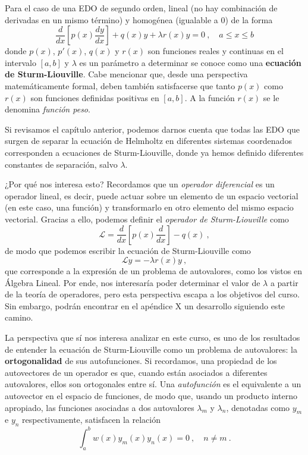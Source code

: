 Para el caso de una EDO de segundo orden, lineal (no hay combinación de derivadas en un mismo término) y homogénea (igualable a 0) de la forma
\begin{equation} \label{eq:Sturm-Liouville}
    \frac{d}{dx}\left[ p(x) \frac{dy}{dx} \right] + q(x) y + \lambda r(x)y = 0 \ , \quad a \leq x \leq b
\end{equation}
donde $p(x)$, $p'(x)$, $q(x)$ y $r(x)$ son funciones reales y continuas en el intervalo $[a,b]$ y $\lambda$ es un parámetro a determinar se conoce como una \textbf{ecuación de Sturm-Liouville}. Cabe mencionar que, desde una perspectiva matemáticamente formal, deben también satisfacerse que tanto $p(x)$ como $r(x)$ son funciones definidas positivas en $[a,b]$. A la función $r(x)$ se le denomina \emph{función peso}.

Si revisamos el capítulo anterior, podemos darnos cuenta que todas las EDO que surgen de separar la ecuación de Helmholtz en diferentes sistemas coordenados corresponden a ecuaciones de Sturm-Liouville, donde ya hemos definido diferentes constantes de separación, salvo $\lambda$.

¿Por qué nos interesa esto? Recordamos que un \emph{operador diferencial} es un operador lineal, es decir, puede actuar sobre un elemento de un espacio vectorial (en este caso, una función) y transformarlo en otro elemento del mismo espacio vectorial. Gracias a ello, podemos definir el \emph{operador de Sturm-Liouville} como
\begin{equation}
    \mathcal{L} = \frac{d}{dx}\left[p(x) \frac{d}{dx}\right] - q(x) \ ,
\end{equation}
de modo que podemos escribir la ecuación de Sturm-Liouville como
\begin{equation}
    \mathcal{L}y = -\lambda r(x) y \ ,
\end{equation}
que corresponde a la expresión de un problema de autovalores, como los vistos en Álgebra Lineal. Por ende, nos interesaría poder determinar el valor de $\lambda$ a partir de la teoría de operadores, pero esta perspectiva escapa a los objetivos del curso. Sin embargo, podrán encontrar en el apéndice X un desarrollo siguiendo este camino.

La perspectiva que sí nos interesa analizar en este curso, es uno de los resultados de entender la ecuación de Sturm-Liouville como un problema de autovalores: la \textbf{ortogonalidad} de sus autofunciones. Si recordamos, una propiedad de los autovectores de un operador es que, cuando están asociados a diferentes autovalores, ellos son ortogonales entre sí. Una \emph{autofunción} es el equivalente a un autovector en el espacio de funciones, de modo que, usando un producto interno apropiado, las funciones asociadas a dos autovalores $\lambda_m$ y $\lambda_n$, denotadas como $y_m$ e $y_n$ respectivamente, satisfacen la relación
\begin{equation}
    \int_a^b w(x) y_m(x) y_n(x) = 0 \ , \quad n \neq m \ .
\end{equation}

